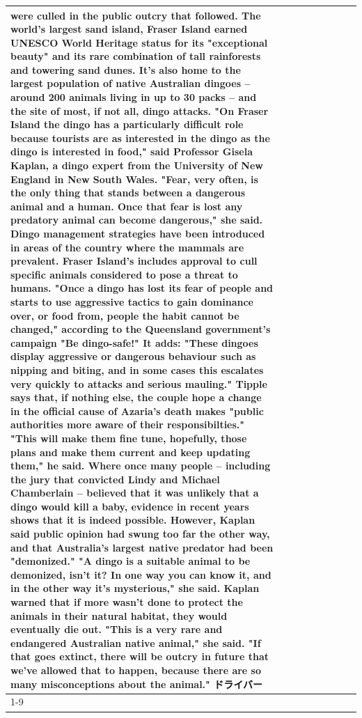 \begin{table}[H]
\begin{tabular}{lllrlllll}
were culled in the public outcry that followed. The world's largest sand island, Fraser Island earned UNESCO World Heritage status for its "exceptional beauty" and its rare combination of tall rainforests and towering sand dunes. It's also home to the largest population of native Australian dingoes -- around 200 animals living in up to 30 packs -- and the site of most, if not all, dingo attacks. "On Fraser Island the dingo has a particularly difficult role because tourists are as interested in the dingo as the dingo is interested in food," said Professor Gisela Kaplan, a dingo expert from the University of New England in New South Wales. "Fear, very often, is the only thing that stands between a dangerous animal and a human. Once that fear is lost any predatory animal can become dangerous," she said. Dingo management strategies have been introduced in areas of the country where the mammals are prevalent. Fraser Island's includes approval to cull specific animals considered to pose a threat to humans. "Once a dingo has lost its fear of people and starts to use aggressive tactics to gain dominance over, or food from, people the habit cannot be changed," according to the Queensland government's campaign "Be dingo-safe!" It adds: "These dingoes display aggressive or dangerous behaviour such as nipping and biting, and in some cases this escalates very quickly to attacks and serious mauling." Tipple says that, if nothing else, the couple hope a change in the official cause of Azaria's death makes "public authorities more aware of their responsibilties." "This will make them fine tune, hopefully, those plans and make them current and keep updating them," he said. Where once many people -- including the jury that convicted Lindy and Michael Chamberlain -- believed that it was unlikely that a dingo would kill a baby, evidence in recent years shows that it is indeed possible. However, Kaplan said public opinion had swung too far the other way, and that Australia's largest native predator had been "demonized." "A dingo is a suitable animal to be demonized, isn't it? In one way you can know it, and in the other way it's mysterious," she said. Kaplan warned that if more wasn't done to protect the animals in their natural habitat, they would eventually die out. "This is a very rare and endangered Australian native animal," she said. "If that goes extinct, there will be outcry in future that we've allowed that to happen, because there are so many misconceptions about the animal." ドライバー \\
\cline{1-9}

\end{tabular}
\end{table}

